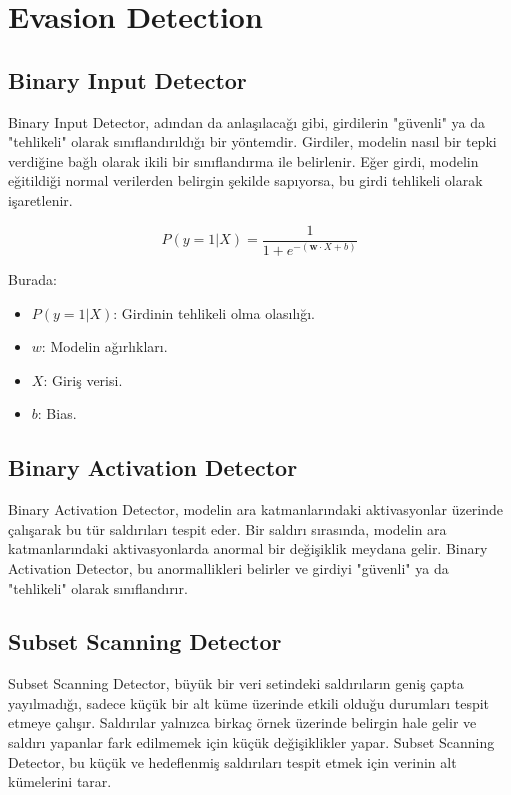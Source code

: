 \section{Evasion Detection}

\subsection{Binary Input Detector}

Binary Input Detector, adından da anlaşılacağı gibi, girdilerin "güvenli" ya da "tehlikeli" olarak sınıflandırıldığı bir yöntemdir. Girdiler, modelin nasıl bir tepki verdiğine bağlı olarak ikili bir sınıflandırma ile belirlenir. Eğer girdi, modelin eğitildiği normal verilerden belirgin şekilde sapıyorsa, bu girdi tehlikeli olarak işaretlenir. 

\[ P(y = 1 | X) = \frac{1}{1 + e^{-(\mathbf{w} \cdot X + b)}} \]

Burada:

\begin{itemize}
    \item $P(y = 1 | X)$: Girdinin tehlikeli olma olasılığı.
    \item $w$: Modelin ağırlıkları.
    \item $X$: Giriş verisi.
    \item $b$: Bias.
\end{itemize}

\newpage

\subsection{Binary Activation Detector}

Binary Activation Detector, modelin ara katmanlarındaki aktivasyonlar üzerinde çalışarak bu tür saldırıları tespit eder. Bir saldırı sırasında, modelin ara katmanlarındaki aktivasyonlarda anormal bir değişiklik meydana gelir. Binary Activation Detector, bu anormallikleri belirler ve girdiyi "güvenli" ya da "tehlikeli" olarak sınıflandırır.

\newpage

\subsection{Subset Scanning Detector}

Subset Scanning Detector, büyük bir veri setindeki saldırıların geniş çapta yayılmadığı, sadece küçük bir alt küme üzerinde etkili olduğu durumları tespit etmeye çalışır. Saldırılar yalnızca birkaç örnek üzerinde belirgin hale gelir ve saldırı yapanlar fark edilmemek için küçük değişiklikler yapar. Subset Scanning Detector, bu küçük ve hedeflenmiş saldırıları tespit etmek için verinin alt kümelerini tarar.

